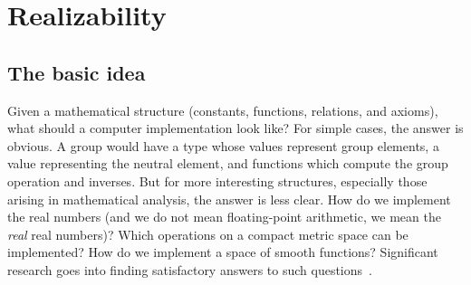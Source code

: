 \chapter{Realizability}
\label{chap:realizability}

\section{The basic idea}
\label{sec:realizability-basic-idea}

Given a mathematical structure (constants, functions, relations, and
axioms), what should a computer implementation look like? For simple
cases, the answer is obvious. A group would have a type whose values
represent group elements, a value representing the neutral element,
and functions which compute the group operation and inverses. But for
more interesting structures, especially those arising in mathematical
analysis, the answer is less clear. How do we implement the real
numbers (and we do not mean floating-point arithmetic, we mean the
\emph{real} real numbers)? Which operations on a compact metric space
can be implemented? How do we implement a space of smooth functions?
Significant research goes into finding satisfactory answers to such
questions~\cite{Wei00,TZ98,Bla97}.

